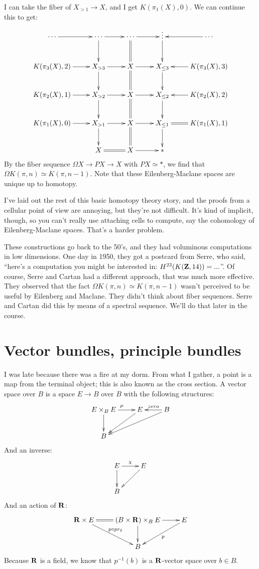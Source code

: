 I can take the fiber of $X_{>1}\to X$, and I get $K(\pi_1(X),0)$. We can continue this to get:
\begin{equation*}
    \xymatrix{
	\cdots\ar[r] & \cdots\ar[r]\ar[d] & \cdots\ar[r]\ar@{=}[d] & \vdots\ar[d] & \cdots\ar[l]\\
	K(\pi_3(X),2)\ar[r] & X_{>3}\ar[r]\ar[d] & X\ar[r]\ar@{=}[d] & X_{\leq 3}\ar[d]& K(\pi_3(X),3)\ar[l]\\
	K(\pi_2(X),1)\ar[r] & X_{>2}\ar[r]\ar[d] & X\ar[r]\ar@{=}[d] & X_{\leq 2}\ar[d]& K(\pi_2(X),2)\ar[l]\\
	K(\pi_1(X),0)\ar[r] & X_{>1}\ar[r]\ar[d] & X\ar[r]\ar@{=}[d] & X_{\leq 1}\ar@{=}[r]\ar[d] & K(\pi_1(X),1)\\
	& X\ar@{=}[r] & X\ar[r] & \ast
    }
\end{equation*}
By the fiber sequence $\Omega X\to PX\to X$ with $PX\simeq \ast$, we find that $\Omega K(\pi,n)\simeq K(\pi,n-1)$. Note that these Eilenberg-Maclane spaces are unique up to homotopy.

I've laid out the rest of this basic homotopy theory story, and the proofs from a cellular point of view are annoying, but they're not difficult. It's kind of implicit, though, so you can't really use attaching cells to compute, say the cohomology of Eilenberg-Maclane spaces. That's a harder problem.

These constructions go back to the 50's, and they had voluminous computations in low dimensions. One day in 1950, they got a postcard from Serre, who said, ``here's a computation you might be interested in: $H^{23}(K(\mathbf Z,14)) = ...$''. Of course, Serre and Cartan had a different approach, that was much more effective. They observed that the fact $\Omega K(\pi,n)\simeq K(\pi,n-1)$ wasn't perceived to be useful by Eilenberg and Maclane. They didn't think about fiber sequences. Serre and Cartan did this by means of a spectral sequence. We'll do that later in the course.
\section{Vector bundles, principle bundles}
I was late because there was a fire at my dorm. From what I gather, a point is a map from the terminal object; this is also known as the cross section. A vector space over $B$ is a space $E\to B$ over $B$ with the following structures:
\begin{equation*}
    \xymatrix{
	E\times_B E\ar[d]\ar[r]^\mu & E\ar[dl] & B\ar[l]_{zero}\ar[dll]\\
	B
    }
\end{equation*}
And an inverse:
\begin{equation*}
    \xymatrix{
	E\ar[d]\ar[r]^\chi & E\ar[dl]\\
	B &
    }
\end{equation*}
And an action of $\mathbf R$:
\begin{equation*}
    \xymatrix{
	\RR\times E\ar[dr]^{p\circ pr_2}\ar@{=}[r] & (B\times\RR)\times_B E\ar[r]\ar[d] & E\ar[dl]^p\\
	& B &
    }
\end{equation*}
Because $\mathbf R$ is a field, we know that $p^{-1}(b)$ is a $\mathbf R$-vector space over $b\in B$.

